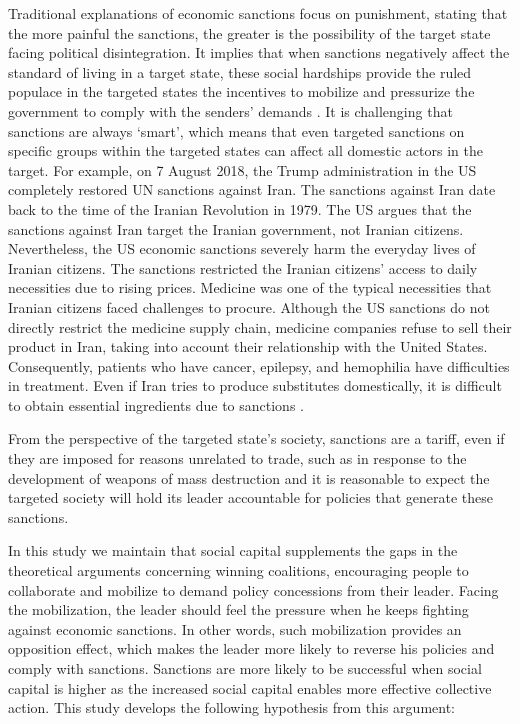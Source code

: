 \documentclass[12pt,]{article}
\begin{document}
Traditional explanations of economic sanctions focus on punishment,
stating that the more painful the sanctions, the greater is the
possibility of the target state facing political disintegration. It
implies that when sanctions negatively affect the standard of living in
a target state, these social hardships provide the ruled populace in the
targeted states the incentives to mobilize and pressurize the government
to comply with the senders' demands \citep[850]{lektzian2007a}. It is
challenging that sanctions are always `smart', which means that even
targeted sanctions on specific groups within the targeted states can
affect all domestic actors in the target. For example, on 7 August 2018,
the Trump administration in the US completely restored UN sanctions
against Iran. The sanctions against Iran date back to the time of the
Iranian Revolution in 1979. The US argues that the sanctions against
Iran target the Iranian government, not Iranian citizens. Nevertheless,
the US economic sanctions severely harm the everyday lives of Iranian
citizens. The sanctions restricted the Iranian citizens' access to daily
necessities due to rising prices. Medicine was one of the typical
necessities that Iranian citizens faced challenges to procure. Although
the US sanctions do not directly restrict the medicine supply chain,
medicine companies refuse to sell their product in Iran, taking into
account their relationship with the United States. Consequently,
patients who have cancer, epilepsy, and hemophilia have difficulties in
treatment. Even if Iran tries to produce substitutes domestically, it is
difficult to obtain essential ingredients due to sanctions
\citep{bbc2014}.

From the perspective of the targeted state's society, sanctions are a
tariff, even if they are imposed for reasons unrelated to trade, such as
in response to the development of weapons of mass destruction and it is
reasonable to expect the targeted society will hold its leader
accountable for policies that generate these sanctions.

In this study we maintain that social capital supplements the gaps in
the theoretical arguments concerning winning coalitions, encouraging
people to collaborate and mobilize to demand policy concessions from
their leader. Facing the mobilization, the leader should feel the
pressure when he keeps fighting against economic sanctions. In other
words, such mobilization provides an opposition effect, which makes the
leader more likely to reverse his policies and comply with sanctions.
Sanctions are more likely to be successful when social capital is higher
as the increased social capital enables more effective collective
action. This study develops the following hypothesis from this argument:
\newline
\end{document}
